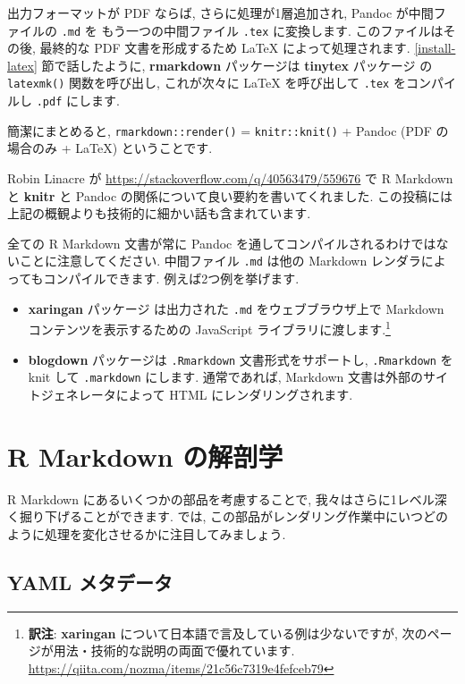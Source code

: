 \documentclass[
  11pt,
  lualatex,ja=standard,jafont=noto]{bxjsreport}
\begin{document}
出力フォーマットが PDF ならば, さらに処理が1層追加され, Pandoc が中間ファイルの \texttt{.md} を もう一つの中間ファイル \texttt{.tex} に変換します. このファイルはその後, 最終的な PDF 文書を形成するため LaTeX によって処理されます. \ref{install-latex} 節で話したように, \textbf{rmarkdown} パッケージは \textbf{tinytex} パッケージ \autocite{R-tinytex} の \texttt{latexmk()} 関数を呼び出し, これが次々に LaTeX を呼び出して \texttt{.tex} をコンパイルし \texttt{.pdf} にします.

簡潔にまとめると, \texttt{rmarkdown::render()} = \texttt{knitr::knit()} + Pandoc (PDF の場合のみ + LaTeX) ということです.

Robin Linacre が \url{https://stackoverflow.com/q/40563479/559676} で R Markdown と \textbf{knitr} と Pandoc の関係について良い要約を書いてくれました. この投稿には上記の概観よりも技術的に細かい話も含まれています.

全ての R Markdown 文書が常に Pandoc を通してコンパイルされるわけではないことに注意してください. 中間ファイル \texttt{.md} は他の Markdown レンダラによってもコンパイルできます. 例えば2つ例を挙げます.

\begin{itemize}
\item
  \textbf{xaringan} パッケージ \autocite{R-xaringan} は出力された \texttt{.md} をウェブブラウザ上で Markdown コンテンツを表示するための JavaScript ライブラリに渡します.\footnote{\textbf{訳注}: \textbf{xaringan} について日本語で言及している例は少ないですが, 次のページが用法・技術的な説明の両面で優れています. \url{https://qiita.com/nozma/items/21c56c7319e4fefceb79}}
\item
  \textbf{blogdown} パッケージは \autocite{R-blogdown} \texttt{.Rmarkdown} 文書形式をサポートし, \texttt{.Rmarkdown} を knit して \texttt{.markdown} にします. 通常であれば, Markdown 文書は外部のサイトジェネレータによって HTML にレンダリングされます.
\end{itemize}

\hypertarget{rmarkdown-anatomy}{%
\section{R Markdown の解剖学}\label{rmarkdown-anatomy}}

R Markdown にあるいくつかの部品を考慮することで, 我々はさらに1レベル深く掘り下げることができます. では, この部品がレンダリング作業中にいつどのように処理を変化させるかに注目してみましょう.

\hypertarget{yaml-metadata}{%
\subsection{YAML メタデータ}\label{yaml-metadata}}
\end{document}
